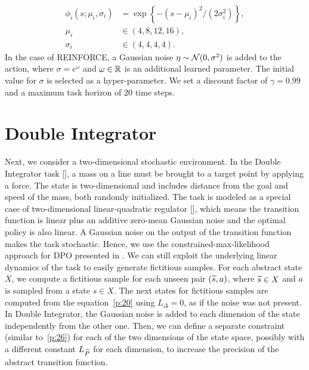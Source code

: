 \begin{align}
\phi_i(s; \mu_i, \sigma_i) &= \exp\left\{-{(s -\mu_i)^2}\big/{(2\sigma_i^2)}\right\}, \nonumber \\
\mu_i &\in (4, 8, 12, 16), \nonumber \\
\sigma_i &\in(4, 4, 4, 4). \nonumber
\end{align}
In the case of REINFORCE, a Gaussian noise $\eta\sim\mathcal{N}(0,\sigma^2)$ is added to the action, where $\sigma=e^{\omega}$ and $\omega\in\mathbb{R}$ is an additional learned parameter. The initial value for $\sigma$ is selected as a hyper-parameter.
We set a discount factor of $\gamma=0.99$ and a maximum task horizon of $20$ time steps.

\section{Double Integrator} \label{sec:mass}
Next, we consider a two-dimensional stochastic environment. In the Double Integrator task [\cite{recht2018tour}], a mass on a line must be brought to a target point by applying a force. The state is two-dimensional and includes distance from the goal and speed of the mass, both randomly initialized. The task is modeled as a special case of two-dimensional linear-quadratic regulator [\cite{peters2002policy}], which means the transition function is linear plus an additive zero-mean Gaussian noise and the optimal policy is also linear. A Gaussian noise on the output of the transition function makes the task stochastic. Hence, we use the constrained-max-likelihood approach for \ac{DPO} presented in . We can still exploit the underlying linear dynamics of the task to easily generate fictitious samples. For each abstract state $X$, we compute a fictitious sample for each unseen pair $(\widetilde{s}, a)$, where $\widetilde{s} \in X$ and $a$ is sampled from a state $s \in X$. The next states for fictitious samples are computed from the equation~\eqref{p:20} using $L_{\Delta}=0$, as if the noise was not present. In Double Integrator, the Gaussian noise is added to each dimension of the state independently from the other one. Then, we can define a separate constraint (similar to~\eqref{p:26}) for each of the two dimensions of the state space, possibly with a different constant $L_{\widetilde{P}}$ for each dimension, to increase the precision of the abstract transition function. \\
